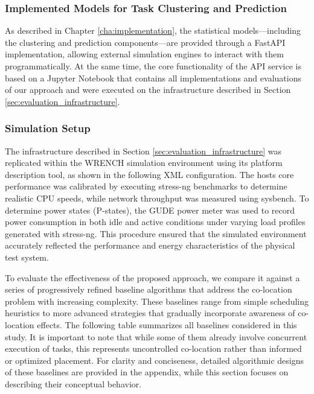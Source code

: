 \subsubsection{Implemented Models for Task Clustering and Prediction}
\label{sec:evaluation_statistical_learning_methods}
As described in Chapter \ref{cha:implementation}, the statistical models—including the clustering and prediction components—are provided through a FastAPI implementation, allowing external simulation engines to interact with them programmatically. At the same time, the core functionality of the API service is based on a Jupyter Notebook that contains all implementations and evaluations of our approach and were executed on the infrastructure described in Section \ref{sec:evaluation_infrastructure}.

\subsubsection{Simulation Setup}
\label{sec:evaluation_simulation}

The infrastructure described in Section \ref{sec:evaluation_infrastructure} was replicated within the WRENCH simulation environment using its platform description tool, as shown in the following XML configuration. The hosts core performance was calibrated by executing stress-ng benchmarks to determine realistic CPU speeds, while network throughput was measured using sysbench. To determine power states (P-states), the GUDE power meter was used to record power consumption in both idle and active conditions under varying load profiles generated with stress-ng. This procedure ensured that the simulated environment accurately reflected the performance and energy characteristics of the physical test system.

\newpage



To evaluate the effectiveness of the proposed approach, we compare it against a series of progressively refined baseline algorithms that address the co-location problem with increasing complexity. These baselines range from simple scheduling heuristics to more advanced strategies that gradually incorporate awareness of co-location effects. The following table summarizes all baselines considered in this study. It is important to note that while some of them already involve concurrent execution of tasks, this represents uncontrolled co-location rather than informed or optimized placement. For clarity and conciseness, detailed algorithmic designs of these baselines are provided in the appendix, while this section focuses on describing their conceptual behavior.

